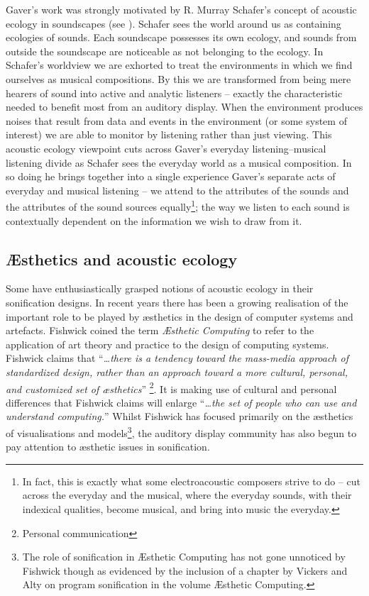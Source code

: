 \documentclass{article}
\begin{document}
Gaver's work was strongly motivated by R. Murray Schafer's concept of acoustic ecology in soundscapes (see \cite{Schafer:1977}). Schafer sees the world around us as containing ecologies of sounds. Each soundscape possesses its own ecology, and sounds from outside the soundscape are noticeable as not belonging to the ecology. In Schafer's worldview we are exhorted to treat the environments in which we find ourselves as musical compositions. By this we are transformed from being mere hearers of sound into active and analytic listeners -- exactly the characteristic needed to benefit most from an auditory display. When the environment produces noises that result from data and events in the environment (or some system of interest) we are able to monitor by listening rather than just viewing. This acoustic ecology viewpoint cuts across Gaver's everyday listening--musical listening divide as Schafer sees the everyday world as a musical composition. In so doing he brings together into a single experience Gaver's separate acts of everyday and musical listening -- we attend to the attributes of the sounds and the attributes of the sound sources equally\footnote{In fact, this is exactly what some electroacoustic composers strive to do – cut across the everyday and the musical, where the everyday sounds, with their indexical qualities, become musical, and bring into music the everyday.}; the way we listen to each sound is contextually dependent on the information we wish to draw from it. 
\subsection{Æsthetics and acoustic ecology}
Some have enthusiastically grasped notions of acoustic ecology in their sonification designs. In recent years there has been a growing realisation of the important role to be played by æsthetics in the design of computer systems and artefacts. Fishwick \cite{Fishwick:2002,Fishwick:2006} coined the term \textit{Æsthetic Computing} to refer to the application of art theory and practice to the design of computing systems. Fishwick claims that ``\textit{…there is a tendency toward the mass-media approach of standardized design, rather than an approach toward a more cultural, personal, and customized set of æsthetics}'' \footnote{Personal communication}. It is making use of cultural and personal differences that Fishwick claims will enlarge ``\textit{…the set of people who can use and understand computing.}'' Whilst Fishwick has focused primarily on the æsthetics of visualisations and models\footnote{The role of sonification in Æsthetic Computing has not gone unnoticed by Fishwick though as evidenced by the inclusion of a chapter by Vickers and Alty \cite{Vickers:2006} on program sonification in the volume Æsthetic Computing.}, the auditory display community has also begun to pay attention to æsthetic issues in sonification.
\end{document}
